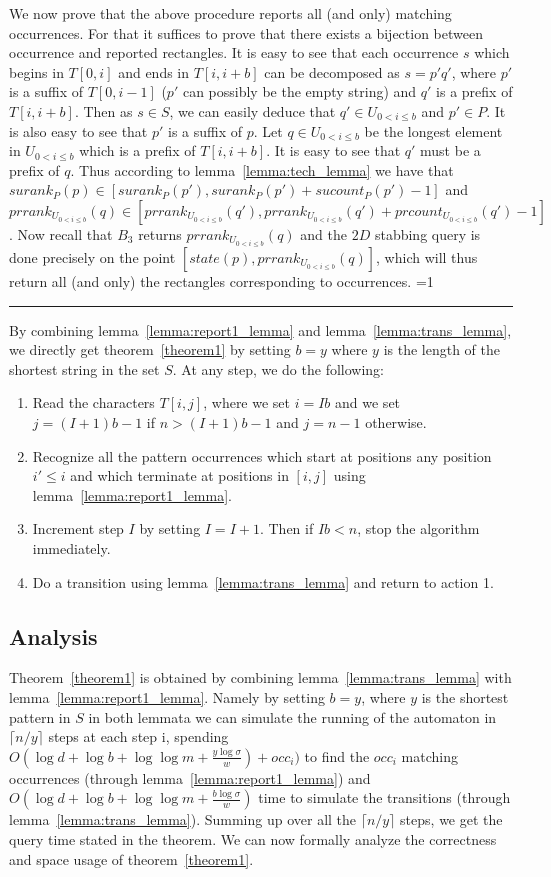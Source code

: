 \documentclass{article}
\newcommand{\?}{\mskip1.5mu}
\newcounter{noqed}
\newcommand{\qed}{ \ifmmode\mbox{
}\fi\rule[-.05em]{.3em}{.7em}\setcounter{noqed}{0}}
\newenvironment{proof}[1][{}]{\noindent{\bf Proof#1.
}\setcounter{noqed}{1}}{\ifnum\value{noqed}=1\qed\fi\par\medskip}
\begin{document}
\begin{proof}
We now prove that the above procedure reports all (and only) matching occurrences. For that it suffices to prove that there exists a bijection between occurrence and reported rectangles. It is easy to see that each occurrence $s$ which begins in $T[0,i]$ and ends in $T[i,i+b]$ can be decomposed as $s=p'q'$, where $p'$ is a suffix of $T[0,i-1]$ ($p'$ can possibly be the empty string) and $q'$ is a prefix of $T[i,i+b]$. Then as $s\in S$, we can easily deduce that $q'\in U_{0<i\leq b}$ and $p'\in P$. It is also easy to see that $p'$ is a suffix of $p$. Let $q\in U_{0<i\leq b}$ be the longest element in $U_{0<i\leq b}$ which is a prefix of $T[i,i+b]$. It is easy to see that $q'$ must be a prefix of $q$. Thus according to lemma~\ref{lemma:tech_lemma} we have that $surank_P(p)\in [surank_P(p'),surank_P(p')+sucount_P(p')-1]$ and $prrank_{U_{0<i\leq b}}(q)\in [prrank_{U_{0<i\leq b}}(q'),prrank_{U_{0<i\leq b}}(q')+prcount_{U_{0<i\leq b}}(q')-1]$. Now recall that $B_3$ returns $prrank_{U_{0<i\leq b}}(q)$ and the $2D$ stabbing query is done precisely on the point $[state(p),prrank_{U_{0<i\leq b}}(q)]$, which will thus return all (and only) the rectangles corresponding to occurrences. 
\end{proof}
By combining lemma~\ref{lemma:report1_lemma} and lemma~\ref{lemma:trans_lemma}, we directly get theorem~\ref{theorem1} by setting $b=y$ where $y$ is the length of the shortest string in the set $S$. At any step, we do the following: 
\begin{enumerate}
\item Read the characters $T[i,j]$, where we set $i=Ib$ and we set $j=(I+1)b-1$ if $n>(I+1)b-1$ and $j=n-1$ otherwise. 
\item Recognize all the pattern occurrences which start at positions any position $i'\leq i$ and which terminate at positions in $[i,j]$ using lemma~\ref{lemma:report1_lemma}. 
\item Increment step $I$ by setting $I=I+1$. Then if $Ib<n$, stop the algorithm immediately. 
\item Do a transition using lemma~\ref{lemma:trans_lemma} and return to action 1. 
\end{enumerate}
\subsection{Analysis}
Theorem~\ref{theorem1} is obtained by combining lemma~\ref{lemma:trans_lemma} with lemma~\ref{lemma:report1_lemma}. Namely by setting $b=y$, where $y$ is the shortest pattern in $S$ in both lemmata we can simulate the running of the automaton in $\lceil n/y\rceil$ steps at each step i, spending $O(\log d+\log b+\log\log m+\frac{y\log\sigma}{w})+occ_i)$ to find the $occ_i$ matching occurrences (through lemma~\ref{lemma:report1_lemma}) and $O(\log d+\log b+\log\log m+\frac{b\log\sigma}{w})$ time to simulate the transitions (through lemma~\ref{lemma:trans_lemma}). Summing up over all the $\lceil n/y\rceil$ steps, we get the query time stated in the theorem.
We can now formally analyze the correctness and space usage of theorem~\ref{theorem1}.  
\end{document}
